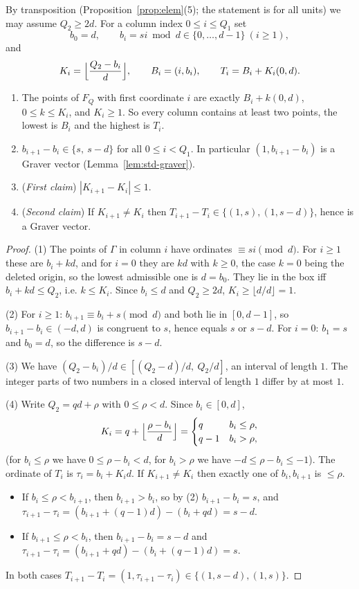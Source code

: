By transposition (Proposition~\ref{prop:elem}(5); the statement is for all units) we may assume $Q_2\ge2d$. For a column index $0\le i\le Q_1$ set
\[
  b_0=d,\qquad b_i=si\bmod d\in\{0,\dots,d-1\}\ (i\ge1),
\]
and
\[
  K_i=\Bigl\lfloor\frac{Q_2-b_i}{d}\Bigr\rfloor,\qquad B_i=(i,b_i),\qquad T_i=B_i+K_i(0,d).
\]

\begin{lemma}[Columns]\label{lem:columns}
\begin{enumerate}
\item The points of $F_Q$ with first coordinate $i$ are exactly $B_i+k(0,d)$, $0\le k\le K_i$, and $K_i\ge1$. So every column contains at least two points, the lowest is $B_i$ and the highest is $T_i$.
\item $b_{i+1}-b_i\in\{s,\ s-d\}$ for all $0\le i<Q_1$. In particular $(1,b_{i+1}-b_i)$ is a Graver vector (Lemma~\ref{lem:std-graver}).
\item (\emph{First claim}) $|K_{i+1}-K_i|\le1$.
\item (\emph{Second claim}) If $K_{i+1}\ne K_i$ then $T_{i+1}-T_i\in\{(1,s),(1,s-d)\}$, hence is a Graver vector.
\end{enumerate}
\end{lemma}
\begin{proof}
(1) The points of $\Gamma$ in column $i$ have ordinates $\equiv si\pmod d$. For $i\ge1$ these are $b_i+kd$, and for $i=0$ they are $kd$ with $k\ge0$, the case $k=0$ being the deleted origin, so the lowest admissible one is $d=b_0$. They lie in the box iff $b_i+kd\le Q_2$, i.e. $k\le K_i$. Since $b_i\le d$ and $Q_2\ge2d$, $K_i\ge\lfloor d/d\rfloor=1$.

(2) For $i\ge1$: $b_{i+1}\equiv b_i+s\pmod d$ and both lie in $[0,d-1]$, so $b_{i+1}-b_i\in(-d,d)$ is congruent to $s$, hence equals $s$ or $s-d$. For $i=0$: $b_1=s$ and $b_0=d$, so the difference is $s-d$.

(3) We have $(Q_2-b_i)/d\in[(Q_2-d)/d,\ Q_2/d]$, an interval of length $1$. The integer parts of two numbers in a closed interval of length $1$ differ by at most $1$.

(4) Write $Q_2=qd+\rho$ with $0\le\rho<d$. Since $b_i\in[0,d]$,
\[
  K_i=q+\Bigl\lfloor\frac{\rho-b_i}d\Bigr\rfloor=\begin{cases}q&b_i\le\rho,\\ q-1&b_i>\rho,\end{cases}
\]
(for $b_i\le\rho$ we have $0\le\rho-b_i<d$, for $b_i>\rho$ we have $-d\le\rho-b_i\le-1$). The ordinate of $T_i$ is $\tau_i=b_i+K_id$. If $K_{i+1}\ne K_i$ then exactly one of $b_i,b_{i+1}$ is $\le\rho$.
\begin{itemize}
\item If $b_i\le\rho<b_{i+1}$, then $b_{i+1}>b_i$, so by (2) $b_{i+1}-b_i=s$, and $\tau_{i+1}-\tau_i=(b_{i+1}+(q-1)d)-(b_i+qd)=s-d$.
\item If $b_{i+1}\le\rho<b_i$, then $b_{i+1}-b_i=s-d$ and $\tau_{i+1}-\tau_i=(b_{i+1}+qd)-(b_i+(q-1)d)=s$.
\end{itemize}
In both cases $T_{i+1}-T_i=(1,\tau_{i+1}-\tau_i)\in\{(1,s-d),(1,s)\}$.
\end{proof}

